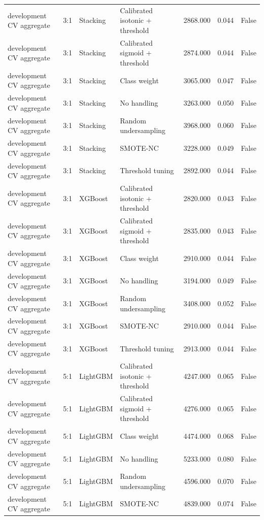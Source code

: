 \begin{tabular}{llllrrr}
development CV aggregate & 3:1 & Stacking & Calibrated isotonic + threshold & 2868.000 & 0.044 & False \\
development CV aggregate & 3:1 & Stacking & Calibrated sigmoid + threshold & 2874.000 & 0.044 & False \\
development CV aggregate & 3:1 & Stacking & Class weight & 3065.000 & 0.047 & False \\
development CV aggregate & 3:1 & Stacking & No handling & 3263.000 & 0.050 & False \\
development CV aggregate & 3:1 & Stacking & Random undersampling & 3968.000 & 0.060 & False \\
development CV aggregate & 3:1 & Stacking & SMOTE-NC & 3228.000 & 0.049 & False \\
development CV aggregate & 3:1 & Stacking & Threshold tuning & 2892.000 & 0.044 & False \\
development CV aggregate & 3:1 & XGBoost & Calibrated isotonic + threshold & 2820.000 & 0.043 & False \\
development CV aggregate & 3:1 & XGBoost & Calibrated sigmoid + threshold & 2835.000 & 0.043 & False \\
development CV aggregate & 3:1 & XGBoost & Class weight & 2910.000 & 0.044 & False \\
development CV aggregate & 3:1 & XGBoost & No handling & 3194.000 & 0.049 & False \\
development CV aggregate & 3:1 & XGBoost & Random undersampling & 3408.000 & 0.052 & False \\
development CV aggregate & 3:1 & XGBoost & SMOTE-NC & 2910.000 & 0.044 & False \\
development CV aggregate & 3:1 & XGBoost & Threshold tuning & 2913.000 & 0.044 & False \\
development CV aggregate & 5:1 & LightGBM & Calibrated isotonic + threshold & 4247.000 & 0.065 & False \\
development CV aggregate & 5:1 & LightGBM & Calibrated sigmoid + threshold & 4276.000 & 0.065 & False \\
development CV aggregate & 5:1 & LightGBM & Class weight & 4474.000 & 0.068 & False \\
development CV aggregate & 5:1 & LightGBM & No handling & 5233.000 & 0.080 & False \\
development CV aggregate & 5:1 & LightGBM & Random undersampling & 4596.000 & 0.070 & False \\
development CV aggregate & 5:1 & LightGBM & SMOTE-NC & 4839.000 & 0.074 & False \\

\end{tabular}
